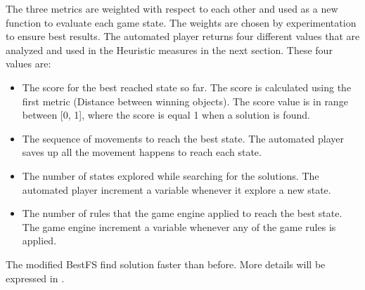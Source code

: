 The three metrics are weighted with respect to each other and used as a new function to evaluate each game state. The weights are chosen by experimentation to ensure best results. The automated player returns four different values that are analyzed and used in the Heuristic measures in the next section. These four values are:
\begin{itemize} \itemsep0pt \parskip0pt 
	\item The score for the best reached state so far. The score is calculated using the first metric (Distance between winning objects). The score value is in range between [0, 1], where the score is equal 1 when a solution is found.
	\item The sequence of movements to reach the best state. The automated player saves up all the movement happens to reach each state.
	\item The number of states explored while searching for the solutions. The automated player increment a variable whenever it explore a new state.
	\item The number of rules that the game engine applied to reach the best state. The game engine increment a variable whenever any of the game rules is applied.
\end{itemize}
The modified BestFS find solution faster than before. More details will be expressed in .\\\par

